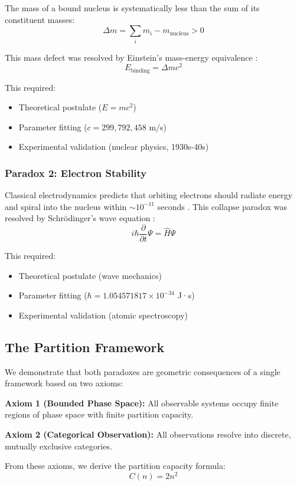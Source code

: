 \documentclass[12pt,a4paper]{article}
\begin{document}
The mass of a bound nucleus is systematically less than the sum of its constituent masses:
$$
\Delta m = \sum_{i} m_i - m_{\text{nucleus}} > 0
$$

This mass defect was resolved by Einstein's mass-energy equivalence \cite{Einstein1905}:
$$
E_{\text{binding}} = \Delta m c^2
$$

This required:
\begin{itemize}
\item Theoretical postulate ($E=mc^2$)
\item Parameter fitting ($c = 299{,}792{,}458$ m/s)
\item Experimental validation (nuclear physics, 1930s-40s)
\end{itemize}

\subsubsection{Paradox 2: Electron Stability}

Classical electrodynamics predicts that orbiting electrons should radiate energy and spiral into the nucleus within $\sim 10^{-11}$ seconds \cite{Larmor1897}. This collapse paradox was resolved by Schrödinger's wave equation \cite{Schrodinger1926}:
$$
i\hbar\frac{\partial}{\partial t}\Psi = \hat{H}\Psi
$$

This required:
\begin{itemize}
\item Theoretical postulate (wave mechanics)
\item Parameter fitting ($\hbar = 1.054571817 \times 10^{-34}$ J·s)
\item Experimental validation (atomic spectroscopy)
\end{itemize}

\subsection{The Partition Framework}

We demonstrate that both paradoxes are geometric consequences of a single framework based on two axioms:

\textbf{Axiom 1 (Bounded Phase Space):} All observable systems occupy finite regions of phase space with finite partition capacity.

\textbf{Axiom 2 (Categorical Observation):} All observations resolve into discrete, mutually exclusive categories.

From these axioms, we derive the partition capacity formula:
$$
C(n) = 2n^2
$$
\end{document}
